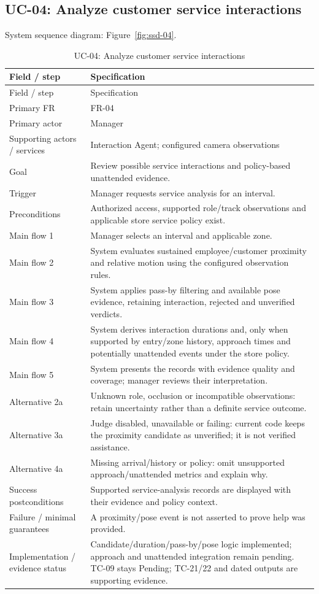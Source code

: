 \subsection*{UC-04: Analyze customer service interactions}
\label{uc:04}
System sequence diagram: Figure~\ref{fig:ssd-04}.

\begin{longtable}{P{0.23\textwidth}P{0.67\textwidth}}
\caption{UC-04: Analyze customer service interactions}\\
\toprule
Field / step & Specification\\
\midrule
\endfirsthead
\toprule
Field / step & Specification\\
\midrule
\endhead
Primary FR & FR-04\\
Primary actor & Manager\\
Supporting actors / services & Interaction Agent; configured camera observations\\
Goal & Review possible service interactions and policy-based unattended evidence.\\
Trigger & Manager requests service analysis for an interval.\\
Preconditions & Authorized access, supported role/track observations and applicable store service policy exist.\\
Main flow 1 & Manager selects an interval and applicable zone.\\
Main flow 2 & System evaluates sustained employee/customer proximity and relative motion using the configured observation rules.\\
Main flow 3 & System applies pass-by filtering and available pose evidence, retaining interaction, rejected and unverified verdicts.\\
Main flow 4 & System derives interaction durations and, only when supported by entry/zone history, approach times and potentially unattended events under the store policy.\\
Main flow 5 & System presents the records with evidence quality and coverage; manager reviews their interpretation.\\
Alternative 2a & Unknown role, occlusion or incompatible observations: retain uncertainty rather than a definite service outcome.\\
Alternative 3a & Judge disabled, unavailable or failing: current code keeps the proximity candidate as unverified; it is not verified assistance.\\
Alternative 4a & Missing arrival/history or policy: omit unsupported approach/unattended metrics and explain why.\\
Success postconditions & Supported service-analysis records are displayed with their evidence and policy context.\\
Failure / minimal guarantees & A proximity/pose event is not asserted to prove help was provided.\\
Implementation / evidence status & Candidate/duration/pass-by/pose logic implemented; approach and unattended integration remain pending. TC-09 stays Pending; TC-21/22 and dated outputs are supporting evidence.\\
\bottomrule
\end{longtable}

